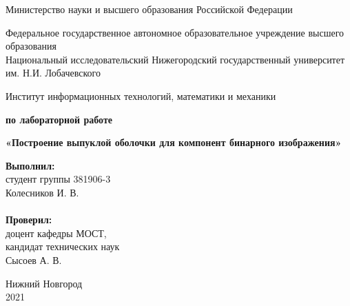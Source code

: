 \documentclass{report}
\begin{document}
\begin{titlepage}

\begin{center}
Министерство науки и высшего образования Российской Федерации
\end{center}

\begin{center}
Федеральное государственное автономное образовательное учреждение высшего образования \\
Национальный исследовательский Нижегородский государственный университет им. Н.И. Лобачевского
\end{center}

\begin{center}
Институт информационных технологий, математики и механики
\end{center}

\vspace{4em}

\begin{center}
\textbf{ по лабораторной работе} \\
\end{center}
\begin{center}
\textbf{\Large«Построение выпуклой оболочки для компонент бинарного изображения»} \\
\end{center}

\vspace{4em}

\newbox{\lbox}
\newlength{\maxl}
\setlength{\maxl}{\wd\lbox}
\hfill\parbox{7cm}{
\hspace*{5cm}\hspace*{-5cm}\textbf{Выполнил:} \\ студент группы 381906-3 \\ Колесников И. В.\\
\\
\hspace*{5cm}\hspace*{-5cm}\textbf{Проверил:}\\ доцент кафедры МОСТ, \\ кандидат технических наук \\ Сысоев А. В.\\
}
\vspace{\fill}

\begin{center} Нижний Новгород \\ 2021 \end{center}

\end{titlepage}
\end{document}
